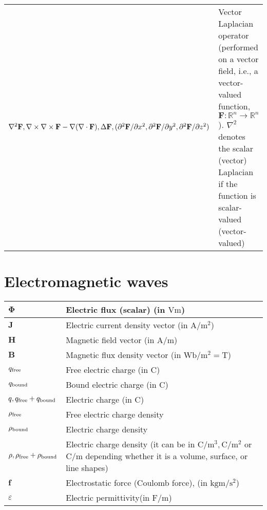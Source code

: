 \documentclass{article}
\begin{document}
\begin{xltabular}{\textwidth}{XX}
    \(\nabla^2 \mathbf{F}, \nabla \times \nabla \times \mathbf{F} - \nabla(\nabla \cdot \mathbf{F}), \Delta \mathbf{F}, \newline (\partial^2\mathbf{F}/\partial x^2 , \partial^2\mathbf{F}/\partial y^2 , \partial^2\mathbf{F}/\partial z^2)\) & Vector Laplacian operator (performed on a vector field, i.e., a vector-valued function, \(\mathbf{F}: \mathbb{R}^{n} \rightarrow \mathbb{R}^{n}\)). \(\nabla^2\) denotes the scalar (vector) Laplacian if the function is scalar-valued (vector-valued)\\
\end{xltabular}

\section{Electromagnetic waves}
\begin{xltabular}{\textwidth}{XX}
    \(\mathbf{\Phi}\) & Electric flux (scalar) (in \(\si{\volt\meter}\))\\ \hline
    \(\mathbf{J}\) & Electric current density vector (in \(\si{\ampere\per\square\meter}\))\\ \hline
    \(\mathbf{H}\) & Magnetic field vector (in \(\si{\ampere\per\meter}\))\\ \hline
    \(\mathbf{B}\) & Magnetic flux density vector (in \(\si{\weber\per\meter\squared} = \si{\tesla}\))\\ \hline
    \(q_{\textnormal{free}}\) & Free electric charge (in \(\si{\coulomb}\)) \\ \hline
    \(q_{\textnormal{bound}}\) & Bound electric charge (in \(\si{\coulomb}\)) \\ \hline
    \(q, q_{\textnormal{free}}+q_{\textnormal{bound}}\) & Electric charge (in \(\si{\coulomb}\)) \\ \hline
    \(\rho_{\textnormal{free}}\) & Free electric charge density\\ \hline
    \(\rho_{\textnormal{bound}}\) & Electric charge density\\ \hline
    \(\rho, \rho_{\textnormal{free}}+\rho_{\textnormal{bound}}\) & Electric charge density (it can be in \(\si{\coulomb\per\meter^3}, \si{\coulomb\per\meter^2}\) or \(\si{\coulomb\per\meter}\) depending whether it is a volume, surface, or line shapes) \\ \hline
    \(\mathbf{f}\) & Electrostatic force (Coulomb force), (in \(\si{\kilo\gram\meter\per\second\squared}\)) \\ \hline
    \(\varepsilon\) & Electric permittivity(in \(\si{\farad\per\meter}\)) \cite{ramoFieldsWavesCommunication1994} \\ \hline

\end{xltabular}
\end{document}
